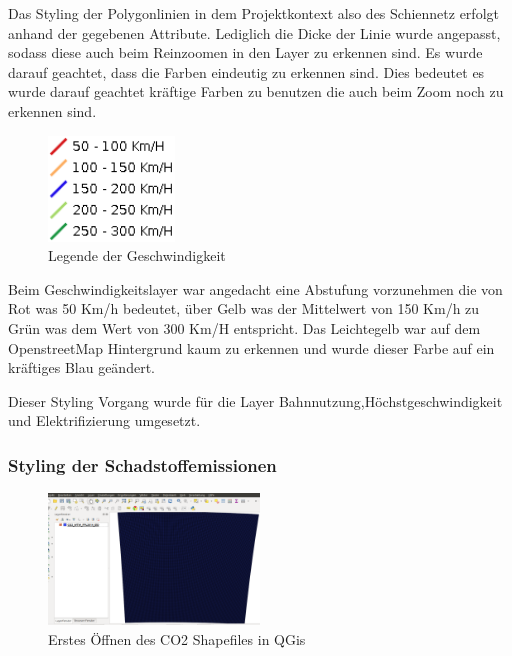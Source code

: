 Das Styling der Polygonlinien in dem Projektkontext also des Schiennetz erfolgt anhand der gegebenen Attribute. Lediglich die Dicke der Linie wurde angepasst, sodass diese auch beim Reinzoomen in den Layer zu erkennen sind. Es wurde darauf geachtet, dass die Farben eindeutig zu erkennen sind. Dies bedeutet es wurde darauf geachtet kräftige Farben zu benutzen die auch beim Zoom noch zu erkennen sind.  
\begin{figure}[h]
\centering
	\includegraphics[width=0.3\textwidth]{images/legend_g.png}
	\caption{Legende der Geschwindigkeit}
\end{figure}
Beim Geschwindigkeitslayer war angedacht eine Abstufung vorzunehmen die von Rot was 50 Km/h bedeutet, über Gelb was der Mittelwert von 150 Km/h zu Grün was dem Wert von 300 Km/H entspricht. Das Leichtegelb war auf dem OpenstreetMap Hintergrund kaum zu erkennen und wurde dieser Farbe auf ein kräftiges Blau geändert.


Dieser Styling Vorgang wurde für die Layer Bahnnutzung,Höchstgeschwindigkeit und Elektrifizierung umgesetzt.
\pagebreak
\subsubsection{Styling der Schadstoffemissionen}
\begin{figure}[h]
\centering
	\includegraphics[width=0.5\textwidth]{images/Raster_Input.png}
	\caption{Erstes Öffnen des CO2 Shapefiles in QGis}
\end{figure}


